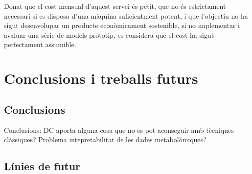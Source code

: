 \documentclass[CAT,BIB]{TFUOC}%
\newcommand{\todo}[1]{
            \begin{tcolorbox}[title=ToDo!, colback=red!5!white, colframe=red!50!black, coltext=red!50!black]
            #1
            \end{tcolorbox}}
\begin{document}
    Donat que el cost mensual d'aquest servei és petit,
    que no és estrictament necessari
    si es disposa d'una màquina suficientment potent,
    i que l'objectiu no ha sigut desenvolupar un producte econòmicament sostenible,
    si no implementar i avaluar una sèrie de models prototip,
    es considera que el cost ha sigut perfectament assumible.


\chapter{Conclusions i treballs futurs}
\label{c:conclusions}

    \section{Conclusions}
    \label{s:conclusions}

\todo{Conclusions: DC aporta alguna cosa que no es pot aconseguir amb tècniques clàssiques?
Problema intepretabilitat de les dades metabolòmiques?}


    \section{Línies de futur}
    \label{s:futur}
\end{document}
